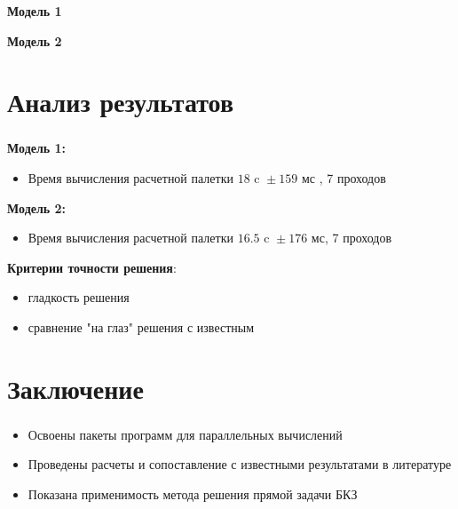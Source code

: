 \begin{frame}
\frametitle{\insertsection}

\vspace{-0.5cm}
\begin{minipage}[t]{0.47\linewidth}
    \textbf{Модель 1}
\end{minipage}
\hfill
\begin{minipage}[t]{0.47\linewidth}
    \textbf{Модель 2}
\end{minipage}

\end{frame}


\section{Анализ результатов}

\begin{frame}
\frametitle{\insertsection}

\textbf{Модель 1:}
\begin{itemize}
    \item Время вычисления расчетной палетки ${18 \text{ c } \pm 159 \text{ мс }}$, 7 проходов
\end{itemize}

\textbf{Модель 2:}
\begin{itemize}
    \item Время вычисления расчетной палетки ${16.5 \text{ c } \pm 176 \text{ мс}}$, 7 проходов
\end{itemize}

\textbf{Критерии точности решения}:
\begin{itemize}
    \item гладкость решения
    \item сравнение "на глаз" решения с известным
\end{itemize}
\end{frame}


\section{Заключение}

\begin{frame}
\frametitle{\insertsection}

\begin{itemize}
    \item Освоены пакеты программ для параллельных вычислений
    \item Проведены расчеты и сопоставление с известными результатами в литературе
    \item Показана применимость метода решения прямой задачи БКЗ
\end{itemize}
\end{frame}

